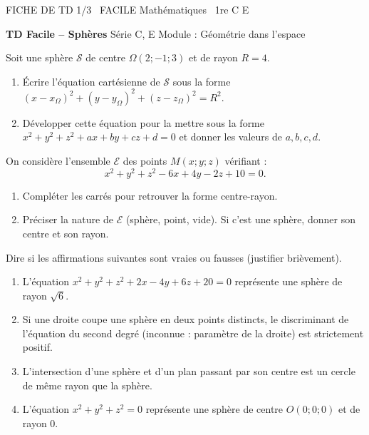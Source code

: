 \documentclass[11pt]{article}
\begin{document}
\begin{tcolorbox}[enhanced,colback=popink,colframe=popink,arc=10pt,boxrule=0pt,left=12pt,right=12pt,top=9pt,bottom=9pt]
{\color{white}\popxbold\small FICHE DE TD 1/3 \textbullet\ FACILE \hfill Mathématiques \textbullet\ 1re C E\par}
\end{tcolorbox}
\vspace{4pt}
\noindent \textbf{TD Facile -- Sphères} \hfill Série C, E \hfill Module : Géométrie dans l'espace

\begin{exercice}
Soit une sphère $\mathcal{S}$ de centre $\Omega(2; -1; 3)$ et de rayon $R = 4$.
\begin{enumerate}
    \item Écrire l'équation cartésienne de $\mathcal{S}$ sous la forme $(x - x_\Omega)^2 + (y - y_\Omega)^2 + (z - z_\Omega)^2 = R^2$.
    \item Développer cette équation pour la mettre sous la forme $x^2+y^2+z^2+ax+by+cz+d=0$ et donner les valeurs de $a, b, c, d$.
\end{enumerate}
\end{exercice}

\begin{exercice}
On considère l'ensemble $\mathcal{E}$ des points $M(x;y;z)$ vérifiant :
\[ x^2+y^2+z^2 - 6x + 4y - 2z + 10 = 0. \]
\begin{enumerate}
    \item Compléter les carrés pour retrouver la forme centre-rayon.
    \item Préciser la nature de $\mathcal{E}$ (sphère, point, vide). Si c'est une sphère, donner son centre et son rayon.
\end{enumerate}
\end{exercice}

\begin{exercice}
Dire si les affirmations suivantes sont vraies ou fausses (justifier brièvement).
\begin{enumerate}
    \item L'équation $x^2+y^2+z^2 + 2x - 4y + 6z + 20 = 0$ représente une sphère de rayon $\sqrt{6}$.
    \item Si une droite coupe une sphère en deux points distincts, le discriminant de l'équation du second degré (inconnue : paramètre de la droite) est strictement positif.
    \item L'intersection d'une sphère et d'un plan passant par son centre est un cercle de même rayon que la sphère.
    \item L'équation $x^2+y^2+z^2 = 0$ représente une sphère de centre $O(0;0;0)$ et de rayon $0$.
\end{enumerate}
\end{exercice}
\end{document}
